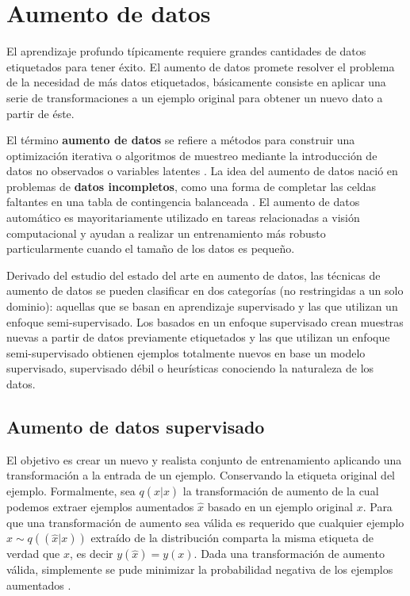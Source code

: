 
\section{Aumento de datos}

El aprendizaje profundo típicamente requiere grandes cantidades de datos etiquetados para tener éxito. El aumento de datos promete resolver el problema de la necesidad de más datos etiquetados, básicamente consiste en aplicar una serie de transformaciones a un ejemplo original para obtener un nuevo dato a partir de éste.

El término \textbf{aumento de datos} se refiere a métodos para construir una optimización iterativa o algoritmos de muestreo mediante la introducción de datos no observados o variables latentes \citep{van2001art}. La idea del aumento de datos nació en problemas de \textbf{datos incompletos}, como una forma de completar las celdas faltantes en una tabla de contingencia balanceada \citep{dempster1977maximum}. El aumento de datos automático es mayoritariamente utilizado en tareas relacionadas a visión computacional y ayudan a realizar un entrenamiento más robusto particularmente cuando el tamaño de los datos es pequeño. 


Derivado del estudio del estado del arte en aumento de datos, las técnicas de aumento de datos se pueden clasificar en dos categorías (no restringidas a un solo dominio): aquellas que se basan en aprendizaje supervisado y las que utilizan un enfoque semi-supervisado. Los basados en un enfoque supervisado crean muestras nuevas a partir de datos previamente etiquetados y las que utilizan un enfoque semi-supervisado obtienen ejemplos totalmente nuevos en base un modelo supervisado, supervisado débil o heurísticas conociendo la naturaleza de los datos.

\subsection{Aumento de datos supervisado} El objetivo es crear un nuevo y realista conjunto de entrenamiento aplicando una transformación a la entrada de un ejemplo. Conservando la etiqueta original del ejemplo. Formalmente, sea $q(\hat{x}|x)$ la transformación de aumento de la cual podemos extraer  ejemplos aumentados $\hat{x}$ basado en un ejemplo original $x$. Para que una transformación de aumento sea válida es requerido que cualquier ejemplo $\hat{x} \sim q((\hat{x}|x))$ extraído de la distribución comparta la misma etiqueta de verdad que $x$, es decir $y(\hat{x})=y(x)$. Dada una transformación de aumento válida, simplemente se pude minimizar la probabilidad negativa de los ejemplos aumentados \citep{xie2019unsupervised}. 

